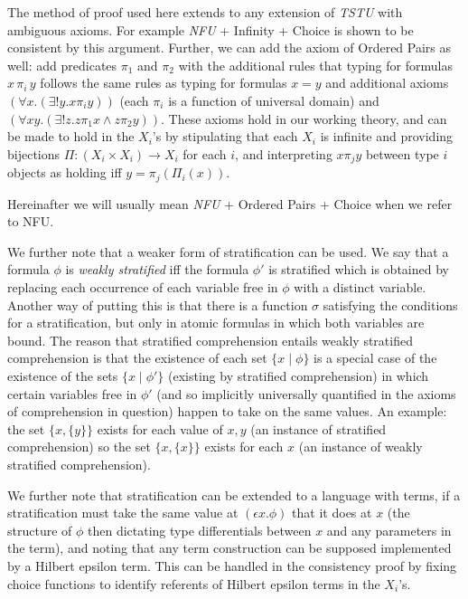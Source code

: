 \documentclass[12pt]{book}
\begin{document}
The method of proof used here extends to any extension of {\em TSTU\/} with ambiguous axioms.  For example {\em NFU\/} + Infinity + Choice is shown to be consistent by this argument.   Further, we can add the axiom of Ordered Pairs as well:  add predicates $\pi_1$ and $\pi_2$ with the additional rules
that typing for formulas $x \, \pi_i \, y$ follows the same rules as typing for formulas $x=y$ and additional axioms $(\forall x.(\exists! y.x \pi_i y))$ (each $\pi_i$ is a function of universal domain) and $(\forall xy.(\exists! z.z \pi_1 x \wedge z \pi_2 y))$.  These axioms hold in our working theory,
and can be made to hold in the $X_i$'s by stipulating that each $X_i$ is infinite and providing bijections $\Pi:(X_i \times X_i) \rightarrow X_i$ for each $i$, and interpreting $x \pi_j y$ between type $i$ objects as holding iff $y=\pi_j(\Pi_i(x))$.

Hereinafter we will usually mean {\em NFU\/} + Ordered Pairs + Choice when we refer to NFU.

We further note that a weaker form of stratification can be used.  We say that a formula $\phi$ is {\em weakly stratified\/} iff
the formula $\phi'$ is stratified which is obtained by replacing each occurrence of each variable free in $\phi$ with a distinct variable.  Another way of putting this is that there is a function $\sigma$ satisfying the conditions for a stratification, but only in atomic formulas in which both variables are bound.  The reason that stratified comprehension entails weakly stratified comprehension is that the existence of each set $\{x \mid \phi\}$
is a special case of the existence of the sets $\{x \mid \phi'\}$ (existing by stratified comprehension)  in which certain variables free in $\phi'$ (and so implicitly universally quantified in the axioms of comprehension in question) happen to take on the same values.   An example:  the set $\{x,\{y\}\}$
exists for each value of $x,y$ (an instance of stratified comprehension) so the set $\{x,\{x\}\}$ exists for each $x$ (an instance of weakly stratified comprehension).

We further note that stratification can be extended to a language with terms, if a stratification must take the same value at $(\epsilon x.\phi)$ that it does at $x$ (the structure of $\phi$ then dictating type differentials between $x$ and any parameters in the term), and noting that any term
construction can be supposed implemented by a Hilbert epsilon term.  This can be handled in the consistency proof by fixing choice functions to identify referents of Hilbert epsilon terms in the $X_i$'s.
\end{document}

